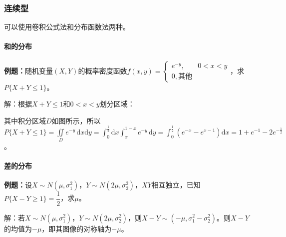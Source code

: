 \documentclass[UTF8, 12pt]{ctexart}
\begin{document}
\subsubsection{连续型}

可以使用卷积公式法和分布函数法两种。

\paragraph{和的分布} \leavevmode \medskip

\textbf{例题：}随机变量$(X,Y)$的概率密度函数$f(x,y)=\left\{\begin{array}{ll}
    e^{-y}, & 0<x<y \\
    0, \text{其他}
\end{array}\right.$，求$P\{X+Y\leqslant1\}$。

解：根据$X+Y\leqslant1$和$0<x<y$划分区域：

\begin{multicols}{2}
    

    其中积分区域$D$如图所示，所以$P\{X+Y\leqslant1\}=\iint\limits_De^{-y}\,\textrm{d}x\textrm{d}y=\int_0^{\frac{1}{2}}\textrm{d}x\int_x^{1-x}e^{-y}\,\textrm{d}y=\int_0^{\frac{1}{2}}(e^{-x}-e^{x-1})\textrm{d}x=1+e^{-1}-2e^{-\frac{1}{2}}$。

\end{multicols}

\paragraph{差的分布} \leavevmode \medskip

\textbf{例题：}设$X\sim N(\mu,\sigma_1^2)$，$Y\sim N(2\mu,\sigma_2^2)$，$XY$相互独立，已知$P\{X-Y\geqslant1\}=\dfrac{1}{2}$，求$\mu$。

解：若$X\sim N(\mu,\sigma_1^2)$，$Y\sim N(2\mu,\sigma_2^2)$，则$X-Y\sim(-\mu,\sigma_1^2-\sigma_2^2)$。则$X-Y$的均值为$-\mu$，即其图像的对称轴为$-\mu$。
\end{document}
